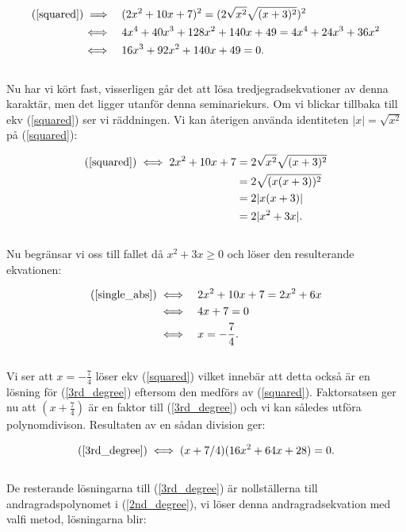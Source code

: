 \documentclass{article}
\begin{document}
\begin{align}
  \text{(\ref{squared})} \implies \quad & (2x^{2} + 10x + 7)^{2} = (2\sqrt{x^{2}}\sqrt{(x+3)^{2}})^{2} \nonumber\\
  \iff \quad & 4x^{4} + 40x^{3} + 128x^{2} + 140x + 49 = 4x^{4} + 24x^{3} + 36x^{2} \nonumber\\
  \iff \quad & 16x^{3} + 92x^{2} + 140x + 49 = 0\text{.} \label{3rd_degree}
\end{align}
\\
Nu har vi kört fast, visserligen går det att lösa tredjegradsekvationer av denna karaktär, men det ligger utanför denna seminariekurs. Om vi blickar tillbaka till ekv (\ref{squared}) ser vi räddningen. Vi kan återigen använda identiteten $|x| = \sqrt{x^{2}}$ på (\ref{squared}):

\begin{align}
  \text(\ref{squared}) \iff 2x^{2} + 10x + 7 &= 2\sqrt{x^{2}}\sqrt{(x+3)^{2}}\nonumber\\
                        &= 2\sqrt{(x(x+3))^{2}}\nonumber\\
                        &= 2|x(x+3)|\nonumber\\
                        &= 2|x^{2} + 3x|\text{.} \label{single_abs}
\end{align}
\\
Nu begränsar vi oss till fallet då $x^{2} + 3x \geq 0$ och löser den resulterande ekvationen:

\begin{align*}
  \text{(\ref{single_abs})} \iff \quad & 2x^{2} + 10x + 7 = 2x^{2} + 6x\\
  \iff \quad & 4x + 7 = 0 \\
  \iff \quad & x = -\frac{7}{4}\text{.}
\end{align*}
\\
Vi ser att $x = -\frac{7}{4}$ löser ekv (\ref{squared}) vilket innebär att detta också är en lösning för (\ref{3rd_degree}) eftersom den medförs av (\ref{squared}). Faktorsatsen ger nu att $(x + \frac{7}{4})$ är en faktor till (\ref{3rd_degree}) och vi kan således utföra polynomdivison. Resultaten av en sådan division ger:

\begin{gather}
  \text{(\ref{3rd_degree})} \iff (x + 7 / 4)(16x^{2} + 64x + 28) = 0\text{.} \label{2nd_degree}
\end{gather}
\\
De resterande lösningarna till (\ref{3rd_degree}) är nollställerna till andragradspolynomet i (\ref{2nd_degree}), vi löser denna andragradsekvation med valfi metod, lösningarna blir:
\end{document}
